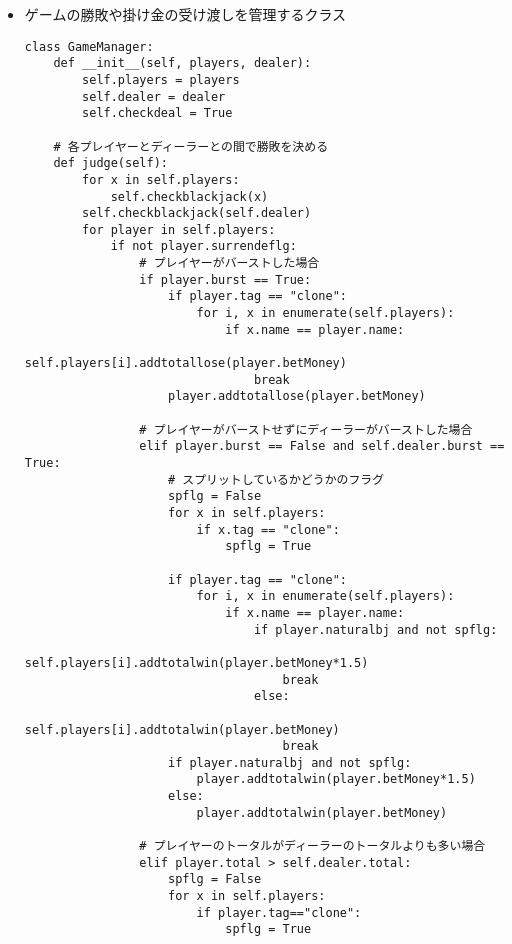 \begin{itemize}
\item ゲームの勝敗や掛け金の受け渡しを管理するクラス
\begin{lstlisting}
class GameManager:
    def __init__(self, players, dealer):
        self.players = players
        self.dealer = dealer
        self.checkdeal = True

    # 各プレイヤーとディーラーとの間で勝敗を決める
    def judge(self):
        for x in self.players:
            self.checkblackjack(x)
        self.checkblackjack(self.dealer)
        for player in self.players:
            if not player.surrendeflg:
                # プレイヤーがバーストした場合
                if player.burst == True:
                    if player.tag == "clone":
                        for i, x in enumerate(self.players):
                            if x.name == player.name:
                                self.players[i].addtotallose(player.betMoney)
                                break
                    player.addtotallose(player.betMoney)

                # プレイヤーがバーストせずにディーラーがバーストした場合
                elif player.burst == False and self.dealer.burst == True:
                    # スプリットしているかどうかのフラグ
                    spflg = False
                    for x in self.players:
                        if x.tag == "clone":
                            spflg = True

                    if player.tag == "clone":
                        for i, x in enumerate(self.players):
                            if x.name == player.name:
                                if player.naturalbj and not spflg:
                                    self.players[i].addtotalwin(player.betMoney*1.5)
                                    break
                                else:
                                    self.players[i].addtotalwin(player.betMoney)
                                    break
                    if player.naturalbj and not spflg:
                        player.addtotalwin(player.betMoney*1.5)
                    else:
                        player.addtotalwin(player.betMoney)

                # プレイヤーのトータルがディーラーのトータルよりも多い場合
                elif player.total > self.dealer.total:
                    spflg = False
                    for x in self.players:
                        if player.tag=="clone":
                            spflg = True


\end{lstlisting}
\end{itemize}
